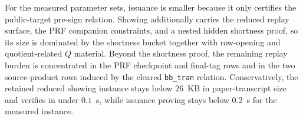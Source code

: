 For the measured parameter sets, issuance is smaller because it only certifies the public-target pre-sign relation.
Showing additionally carries the reduced replay surface, the PRF companion constraints, and a nested hidden shortness
proof, so its size is dominated by the shortness bucket together with row-opening and quotient-related \(Q\) material.
Beyond the shortness proof, the remaining replay burden is concentrated in the PRF checkpoint and final-tag rows and in
the two source-product rows induced by the cleared \texttt{bb\_tran} relation. Conservatively, the retained reduced
showing instance stays below \(26\)~KB in paper-transcript size and verifies in under \(0.1\)~s, while issuance proving
stays below \(0.2\)~s for the measured instance.
